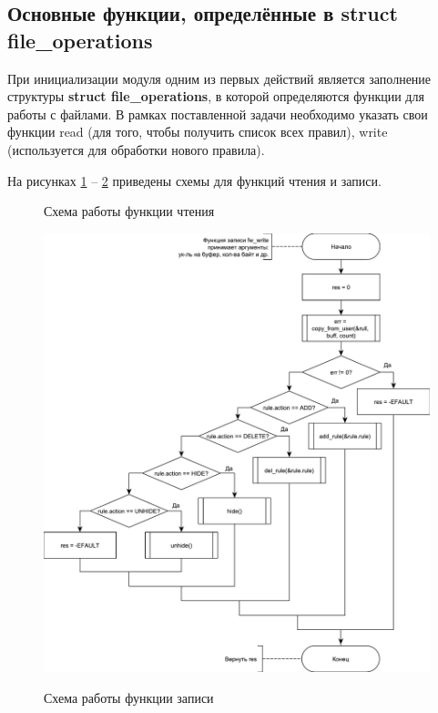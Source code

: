 \newpage

\subsection{Основные функции, определённые в struct file\_operations}
При инициализации модуля одним из первых действий является заполнение структуры \textbf{struct file\_operations}, в которой определяются функции для работы с файлами. В рамках поставленной задачи необходимо указать свои функции read (для того, чтобы получить список всех правил), write (используется для обработки нового правила). 

На рисунках \ref{fig5:image} -- \ref{fig6:image} приведены схемы для функций чтения и записи.
\begin{figure}[h!]
	\begin{center}
		\caption{Схема работы функции чтения}
		\label{fig5:image}
	\end{center}
\end{figure}

\begin{figure}[h!]
	\begin{center}
		{\includegraphics[scale = 0.6]{img/write.pdf}}
		\caption{Схема работы функции записи}
		\label{fig6:image}
	\end{center}
\end{figure}

